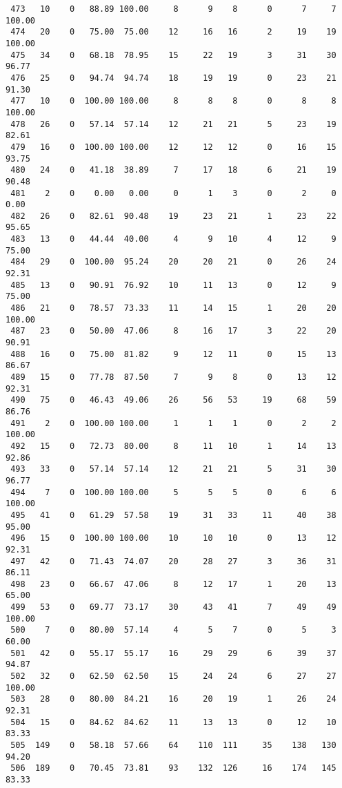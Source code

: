 \begin{verbatim}
 473   10    0   88.89 100.00     8      9    8      0      7     7   100.00
 474   20    0   75.00  75.00    12     16   16      2     19    19   100.00
 475   34    0   68.18  78.95    15     22   19      3     31    30    96.77
 476   25    0   94.74  94.74    18     19   19      0     23    21    91.30
 477   10    0  100.00 100.00     8      8    8      0      8     8   100.00
 478   26    0   57.14  57.14    12     21   21      5     23    19    82.61
 479   16    0  100.00 100.00    12     12   12      0     16    15    93.75
 480   24    0   41.18  38.89     7     17   18      6     21    19    90.48
 481    2    0    0.00   0.00     0      1    3      0      2     0     0.00
 482   26    0   82.61  90.48    19     23   21      1     23    22    95.65
 483   13    0   44.44  40.00     4      9   10      4     12     9    75.00
 484   29    0  100.00  95.24    20     20   21      0     26    24    92.31
 485   13    0   90.91  76.92    10     11   13      0     12     9    75.00
 486   21    0   78.57  73.33    11     14   15      1     20    20   100.00
 487   23    0   50.00  47.06     8     16   17      3     22    20    90.91
 488   16    0   75.00  81.82     9     12   11      0     15    13    86.67
 489   15    0   77.78  87.50     7      9    8      0     13    12    92.31
 490   75    0   46.43  49.06    26     56   53     19     68    59    86.76
 491    2    0  100.00 100.00     1      1    1      0      2     2   100.00
 492   15    0   72.73  80.00     8     11   10      1     14    13    92.86
 493   33    0   57.14  57.14    12     21   21      5     31    30    96.77
 494    7    0  100.00 100.00     5      5    5      0      6     6   100.00
 495   41    0   61.29  57.58    19     31   33     11     40    38    95.00
 496   15    0  100.00 100.00    10     10   10      0     13    12    92.31
 497   42    0   71.43  74.07    20     28   27      3     36    31    86.11
 498   23    0   66.67  47.06     8     12   17      1     20    13    65.00
 499   53    0   69.77  73.17    30     43   41      7     49    49   100.00
 500    7    0   80.00  57.14     4      5    7      0      5     3    60.00
 501   42    0   55.17  55.17    16     29   29      6     39    37    94.87
 502   32    0   62.50  62.50    15     24   24      6     27    27   100.00
 503   28    0   80.00  84.21    16     20   19      1     26    24    92.31
 504   15    0   84.62  84.62    11     13   13      0     12    10    83.33
 505  149    0   58.18  57.66    64    110  111     35    138   130    94.20
 506  189    0   70.45  73.81    93    132  126     16    174   145    83.33

\end{verbatim}
